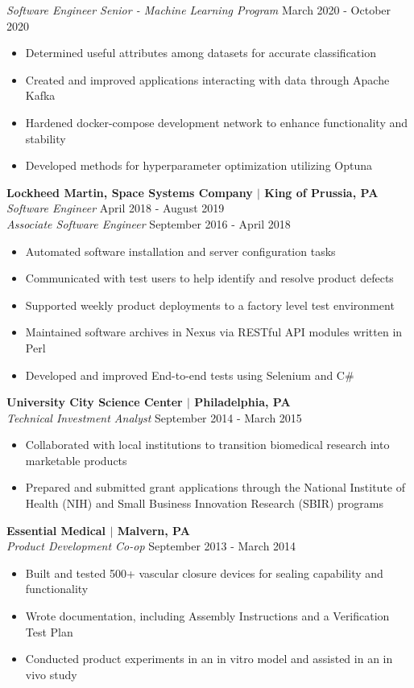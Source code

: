\documentclass[line,resmargin,11pt]{res}
\begin{document}
\begin{resume}
{\sl Software Engineer Senior - Machine Learning Program} \hfill March 2020 - October 2020
	\begin{itemize} \itemsep -2pt %
		\item Determined useful attributes among datasets for accurate classification
		\item Created and improved applications interacting with data through Apache Kafka
		\item Hardened docker-compose development network to enhance functionality and stability
		\item Developed methods for hyperparameter optimization utilizing Optuna
	\end{itemize}

\textbf{Lockheed Martin, Space Systems Company $|$ King of Prussia, PA} \\
{\sl Software Engineer} \hfill April 2018 - August 2019 \\
{\sl Associate Software Engineer} \hfill September 2016 - April 2018
	\begin{itemize}  \itemsep -2pt %
		\item Automated software installation and server configuration tasks
		\item Communicated with test users to help identify and resolve product defects
		\item Supported weekly product deployments to a factory level test environment
		\item Maintained software archives in Nexus via RESTful API modules written in Perl
		\item Developed and improved End-to-end tests using Selenium and C\#
	\end{itemize}
				
\textbf{University City Science Center $|$ Philadelphia, PA} \\
{\sl Technical Investment Analyst} \hfill September 2014 - March 2015 
	\begin{itemize} \itemsep -2pt
		\item Collaborated with local institutions to transition biomedical research into marketable products
		\item Prepared and submitted grant applications through the National Institute of Health (NIH) and Small Business Innovation Research (SBIR) programs
	\end{itemize}
				
\textbf{Essential Medical $|$ Malvern, PA} \\
{\sl Product Development Co-op} \hfill September 2013 - March 2014
	\begin{itemize} \itemsep -2pt
		\item  Built and tested 500+ vascular closure devices for sealing capability and functionality
		\item  Wrote documentation, including Assembly Instructions and a Verification Test Plan
		\item  Conducted product experiments in an in vitro model and assisted in an in vivo study
	\end{itemize}


\end{resume}
\end{document}
